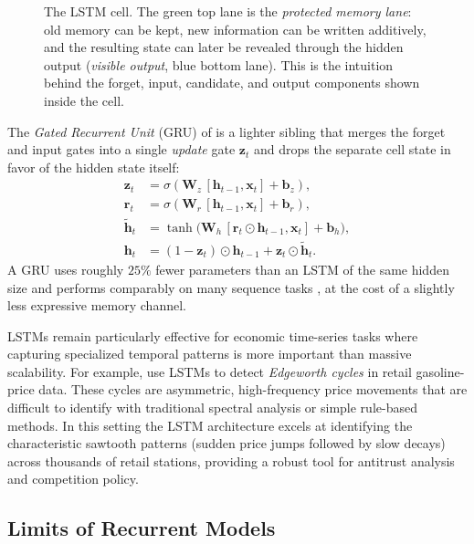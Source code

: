 \documentclass[11pt,a4paper]{report}
\newcommand{\x}{\bm{x}}
\newcommand{\h}{\bm{h}}
\newcommand{\bb}{\bm{b}}
\newcommand{\W}{\bm{W}}
\begin{document}
\begin{figure}[ht]
\caption{The LSTM cell.  The green top lane is the \emph{protected memory lane}: old memory can be kept, new information can be written additively, and the resulting state can later be revealed through the hidden output (\emph{visible output}, blue bottom lane).  This is the intuition behind the forget, input, candidate, and output components shown inside the cell.}
\label{fig:lstm_cell}
\end{figure}

The \emph{Gated Recurrent Unit} (GRU) of \citet{cho2014gru} is a lighter sibling that merges the forget and input gates into a single \emph{update} gate $\bm{z}_t$ and drops the separate cell state in favor of the hidden state itself:
\begin{align}
\bm{z}_t       &= \sigma(\W_z\,[\h_{t-1}, \x_t] + \bb_z), \\
\bm{r}_t       &= \sigma(\W_r\,[\h_{t-1}, \x_t] + \bb_r), \\
\tilde{\h}_t   &= \tanh\!\big(\W_h\,[\bm{r}_t \odot \h_{t-1}, \x_t] + \bb_h\big), \\
\h_t           &= (1 - \bm{z}_t) \odot \h_{t-1} + \bm{z}_t \odot \tilde{\h}_t.
\end{align}
A GRU uses roughly $25\%$ fewer parameters than an LSTM of the same hidden size and performs comparably on many sequence tasks \citep{chung2014empirical}, at the cost of a slightly less expressive memory channel.

LSTMs remain particularly effective for economic time-series tasks where capturing specialized temporal patterns is more important than massive scalability.  For example, \citet{holt2024detecting} use LSTMs to detect \emph{Edgeworth cycles} in retail gasoline-price data.  These cycles are asymmetric, high-frequency price movements that are difficult to identify with traditional spectral analysis or simple rule-based methods.  In this setting the LSTM architecture excels at identifying the characteristic sawtooth patterns (sudden price jumps followed by slow decays) across thousands of retail stations, providing a robust tool for antitrust analysis and competition policy.

\subsection{Limits of Recurrent Models}
\label{sec:rnn_limits}
\end{document}
